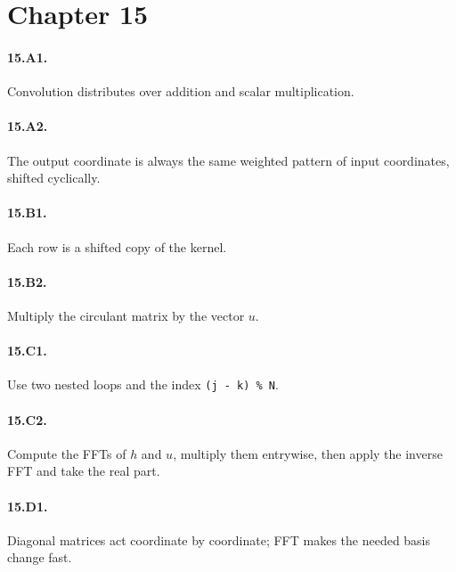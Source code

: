 \section*{Chapter 15}
\paragraph{15.A1.} Convolution distributes over addition and scalar
multiplication.
\paragraph{15.A2.} The output coordinate is always the same weighted pattern
of input coordinates, shifted cyclically.
\paragraph{15.B1.} Each row is a shifted copy of the kernel.
\paragraph{15.B2.} Multiply the circulant matrix by the vector $u$.
\paragraph{15.C1.} Use two nested loops and the index \texttt{(j - k) \% N}.
\paragraph{15.C2.} Compute the FFTs of $h$ and $u$, multiply them entrywise,
then apply the inverse FFT and take the real part.
\paragraph{15.D1.} Diagonal matrices act coordinate by coordinate; FFT makes
the needed basis change fast.
